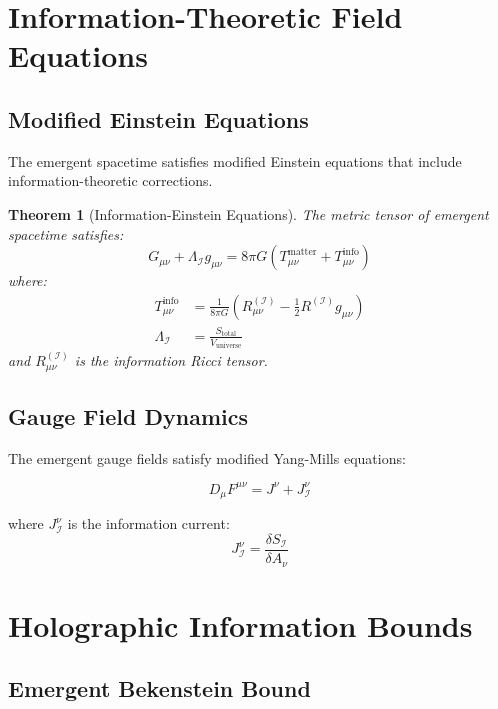 \documentclass{article}
\newtheorem{theorem}{Theorem}[section]
\begin{document}
\section{Information-Theoretic Field Equations}

\subsection{Modified Einstein Equations}

The emergent spacetime satisfies modified Einstein equations that include information-theoretic corrections.

\begin{theorem}[Information-Einstein Equations]
The metric tensor of emergent spacetime satisfies:
\begin{equation}
G_{\mu\nu} + \Lambda_{\mathcal{I}} g_{\mu\nu} = 8\pi G (T_{\mu\nu}^{\text{matter}} + T_{\mu\nu}^{\text{info}})
\end{equation}
where:
\begin{align}
T_{\mu\nu}^{\text{info}} &= \frac{1}{8\pi G} \left( R_{\mu\nu}^{(\mathcal{I})} - \frac{1}{2} R^{(\mathcal{I})} g_{\mu\nu} \right) \\
\Lambda_{\mathcal{I}} &= \frac{S_{\text{total}}}{V_{\text{universe}}}
\end{align}
and $R_{\mu\nu}^{(\mathcal{I})}$ is the information Ricci tensor.
\end{theorem}

\subsection{Gauge Field Dynamics}

The emergent gauge fields satisfy modified Yang-Mills equations:

\begin{equation}
D_\mu F^{\mu\nu} = J^\nu + J_{\mathcal{I}}^\nu
\end{equation}

where $J_{\mathcal{I}}^\nu$ is the information current:
\begin{equation}
J_{\mathcal{I}}^\nu = \frac{\delta S_{\mathcal{I}}}{\delta A_\nu}
\end{equation}

\section{Holographic Information Bounds}

\subsection{Emergent Bekenstein Bound}
\end{document}
